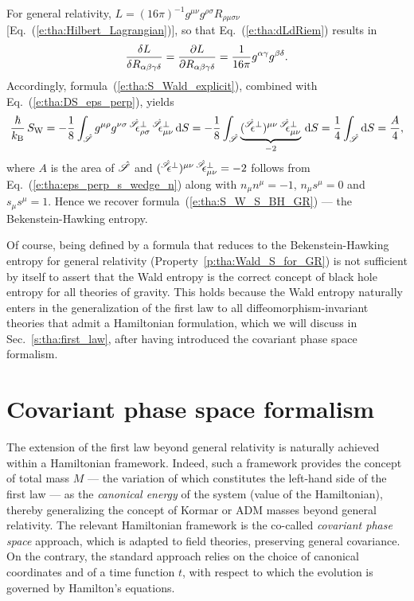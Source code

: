 \begin{example}
For general relativity,
$L = (16\pi)^{-1} g^{\mu\nu} g^{\rho\sigma} R_{\rho\mu\sigma\nu}$
[Eq.~(\ref{e:tha:Hilbert_Lagrangian})], so that Eq.~(\ref{e:tha:dLdRiem}) results in
\[
    \frac{\delta L}{\delta R_{\alpha\beta\gamma\delta}} = \frac{\partial L}{\partial R_{\alpha\beta\gamma\delta}}
    = \frac{1}{16\pi} g^{\alpha\gamma} g^{\beta\delta} .
\]
Accordingly, formula~(\ref{e:tha:S_Wald_explicit}), combined with Eq.~(\ref{e:tha:DS_eps_perp}), yields
\[
    \frac{\hbar}{k_{\rm  B}} \, S_{\rm W}  = -\frac{1}{8} \int_{\hat{\Sp}} g^{\mu\rho} g^{\nu\sigma} \,
    {}^{\hat{\Sp}}\!\!\eps^\perp_{\rho\sigma} \, {}^{\hat{\Sp}}\!\!\eps^\perp_{\mu\nu} \,
    \D S
    = - \frac{1}{8} \int_{\hat{\Sp}}
    \underbrace{({}^{\hat{\Sp}}\!\!\eps^\perp)^{\mu\nu} \, {}^{\hat{\Sp}}\!\!\eps^\perp_{\mu\nu}}_{-2} \,  \D S
    = \frac{1}{4} \int_{\hat{\Sp}} \D S  = \frac{A}{4} ,
\]
where $A$ is the area of $\hat{\mathscr{S}}$ and $({}^{\hat{\mathscr{S}}}\!\!\epsilon^\perp)^{\mu\nu} \, {}^{\hat{\mathscr{S}}}\!\!\epsilon^\perp_{\mu\nu}=-2$
follows from Eq.~(\ref{e:tha:eps_perp_s_wedge_n}) along with
$n_\mu n^\mu = -1$, $n_\mu s^\mu = 0$ and $s_\mu s^\mu = 1$.
Hence we recover formula~(\ref{e:tha:S_W_S_BH_GR}) --- the Bekenstein-Hawking entropy.
\end{example}

Of course, being defined by a formula that reduces to the Bekenstein-Hawking entropy
for general relativity (Property~\ref{p:tha:Wald_S_for_GR})
is not sufficient by itself to assert that the Wald entropy
is the correct concept of black hole entropy for all theories
of gravity. This holds because the Wald entropy naturally enters in the
generalization of the first law to all diffeomorphism-invariant theories
that admit a Hamiltonian formulation, which we will discuss in Sec.~\ref{s:tha:first_law},
after having introduced the covariant phase space formalism.



\section{Covariant phase space formalism}

The extension of the first law beyond general relativity is naturally achieved
within a Hamiltonian framework. Indeed, such a framework provides the concept
of total mass $M$ --- the variation of which constitutes the left-hand side of the first law --- as the \emph{canonical energy} of the system (value of the Hamiltonian),
thereby generalizing the concept of Kormar or ADM masses beyond general relativity.
The relevant Hamiltonian framework is the co-called \emph{covariant phase space} approach,
which is adapted to field theories, preserving general covariance.
On the contrary, the standard approach relies on the choice of
canonical coordinates and of
a time function $t$, with respect to which the evolution is governed by
Hamilton's equations.

